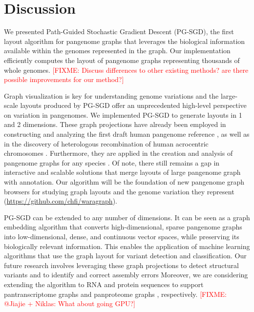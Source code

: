 \documentclass{bioinfo}
\theoremstyle{definition}
\newcommand{\red}[1]{{\textcolor{Red}{#1}}}
\newcommand{\FIXME}[1]{\red{[FIXME: #1]}}
\begin{document}
	\section{Discussion}
	\label{sec:discussion}
	
	We presented Path-Guided Stochastic Gradient Descent (PG-SGD), the first layout algorithm for pangenome graphs that leverages the biological information available within the genomes represented in the graph.
	Our implementation efficiently computes the layout of pangenome graphs representing thousands of whole genomes.
	\FIXME{Discuss differences to other existing methods? are there possible improvements for our method?}
	
	Graph visualization is key for understanding genome variations and the large-scale layouts produced by PG-SGD offer an unprecedented high-level perspective on variation in pangenomes.
	We implemented PG-SGD to generate layouts in 1 and 2 dimensions.
	These graph projections have already been employed in constructing and analyzing the first draft human pangenome reference \citep{Liao2023}, as well as in the discovery of heterologous recombination of human acrocentric chromosomes \citep{Guarracino2023}.
	Furthermore, they are applied in the creation and analysis of pangenome graphs for any species \citep{Guarracino2022, Garrison2023}.
	Of note, there still remains a gap in interactive and scalable solutions that merge layouts of large pangenome graph with annotation.
	Our algorithm will be the foundation of new pangenome graph browsers for studying graph layouts and the genome variation they represent (\url{https://github.com/chfi/waragraph}).
	
	PG-SGD can be extended to any number of dimensions.
	It can be seen as a graph embedding algorithm that converts high-dimensional, sparse pangenome graphs into low-dimensional, dense, and continuous vector spaces, while preserving its biologically relevant information.
	This enables the application of machine learning algorithms that use the graph layout for variant detection and classification. 
	Our future research involves leveraging these graph projections to detect structural variants and to identify and correct assembly errors
	Moreover, we are considering extending the algorithm to RNA and protein sequences to support pantranscriptome graphs \citep{sibbesen_haplotype-aware_2023} and panproteome graphs \citep{dabbaghie_panpa:_2023}, respectively.
	\FIXME{@Jiajie + Niklas: What about going GPU?}
\end{document}
